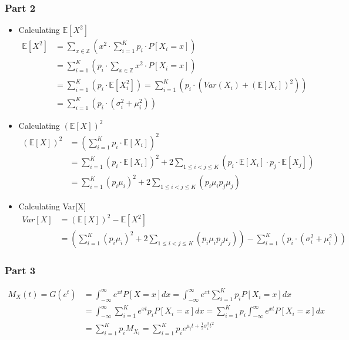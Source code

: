 \subsubsection{Part 2}
\begin{itemize}
\item Calculating $\mathbb{E}[X^2]$
\begin{align*}
    \mathbb{E}[X^2]&=\sum_{x\in \mathbb{Z}} \left(x^2 \cdot \sum_{i=1}^{K} p_i\cdot P[X_i=x] \right) \\
    &=\sum_{i=1}^{K} \left(p_i\cdot \sum_{x\in \mathbb{Z}} x^2 \cdot P[X_i=x]\right)\\
    &=\sum_{i=1}^{K} \left(p_i\cdot \mathbb{E}[X_i^2]\right)
    =\sum_{i=1}^{K} \left(p_i\cdot \left(Var(X_i) + \left(\mathbb{E}[X_i]\right)^2\right)\right)\\
    &=\sum_{i=1}^{K} \left(p_i\cdot \left(\sigma_i^2 + \mu_i^2\right)\right)
\end{align*}
\item Calculating $\left(\mathbb{E}[X]\right)^2$
\begin{align*}
    \left(\mathbb{E}[X]\right)^2&=\left(\sum_{i=1}^{K} p_i\cdot \mathbb{E}[X_i]\right)^2\\
    &=\sum_{i=1}^{K} \left(p_i\cdot \mathbb{E}[X_i]\right)^2 + 2 \sum_{1\leq i<j\leq K} \left(p_i\cdot \mathbb{E}[X_i] \cdot p_j\cdot \mathbb{E}[X_j]\right)  \\
    &=\sum_{i=1}^{K} \left(p_i \mu_i\right)^2 + 2 \sum_{1\leq i<j\leq K} \left(p_i \mu_i  p_j \mu_j\right)
\end{align*}
\item Calculating Var[X]
\begin{align*}
    Var[X]&=\left(\mathbb{E}[X]\right)^2-\mathbb{E}[X^2]\\
    &=\left(\sum_{i=1}^{K} \left(p_i \mu_i\right)^2 + 2 \sum_{1\leq i<j\leq K} \left(p_i \mu_i  p_j \mu_j\right)\right) - \sum_{i=1}^{K} \left(p_i\cdot \left(\sigma_i^2 + \mu_i^2\right)\right)
\end{align*}
\end{itemize}
\subsubsection{Part 3}
    \begin{align*}
        M_X(t)=G(e^t)&=\int_{-\infty}^{\infty} e^{xt}P[X=x]dx = \int_{-\infty}^{\infty} e^{xt} \sum_{i=1}^{K}p_iP[X_i=x]dx\\
        &= \int_{-\infty}^{\infty}\sum_{i=1}^{K} e^{xt} p_i P[X_i=x]dx = \sum_{i=1}^{K} p_i\int_{-\infty}^{\infty}e^{xt} P[X_i=x]dx\\
        &= \sum_{i=1}^{K} p_i M_{X_i} = \sum_{i=1}^{K} p_i e^{\mu_it+\frac{1}{2}\sigma_i^2t^2} 
    \end{align*}

